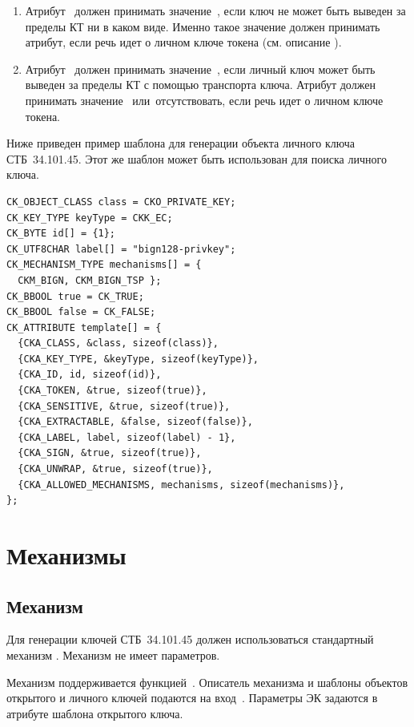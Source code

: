 \begin{enumerate}
\item
Атрибут~ должен принимать значение~,
если ключ не может быть выведен за пределы КТ ни в каком виде.
%
Именно такое значение должен принимать атрибут,
если речь идет о личном ключе токена (см. описание ). 

\item
Атрибут~ должен принимать значение~,
если личный ключ может быть выведен за пределы КТ с помощью транспорта 
ключа. 
%
Атрибут должен принимать значение~ или~отсутствовать, если 
речь идет о личном ключе токена.
\end{enumerate}

Ниже приведен пример шаблона для генерации объекта личного ключа СТБ~34.101.45. 
Этот же шаблон может быть использован для поиска личного ключа.

\begin{verbatim}
CK_OBJECT_CLASS class = CKO_PRIVATE_KEY;
CK_KEY_TYPE keyType = CKK_EC;
CK_BYTE id[] = {1};
CK_UTF8CHAR label[] = "bign128-privkey";
CK_MECHANISM_TYPE mechanisms[] = {
  CKM_BIGN, CKM_BIGN_TSP };
CK_BBOOL true = CK_TRUE;
CK_BBOOL false = CK_FALSE;
CK_ATTRIBUTE template[] = {
  {CKA_CLASS, &class, sizeof(class)},
  {CKA_KEY_TYPE, &keyType, sizeof(keyType)},
  {CKA_ID, id, sizeof(id)},
  {CKA_TOKEN, &true, sizeof(true)},
  {CKA_SENSITIVE, &true, sizeof(true)},
  {CKA_EXTRACTABLE, &false, sizeof(false)},
  {CKA_LABEL, label, sizeof(label) - 1},
  {CKA_SIGN, &true, sizeof(true)},
  {CKA_UNWRAP, &true, sizeof(true)},
  {CKA_ALLOWED_MECHANISMS, mechanisms, sizeof(mechanisms)},
};
\end{verbatim}

\section{Механизмы}
                                                                                                                 
\subsection{Механизм }\label{CRYPTOKI.Gen}

Для генерации ключей СТБ~34.101.45 должен использоваться стандартный 
механизм . Механизм не имеет параметров. 

Механизм поддерживается функцией~. 
%
Описатель механизма и шаблоны объектов открытого и личного ключей подаются на
вход~. Параметры ЭК задаются в атрибуте
 шаблона открытого ключа.

